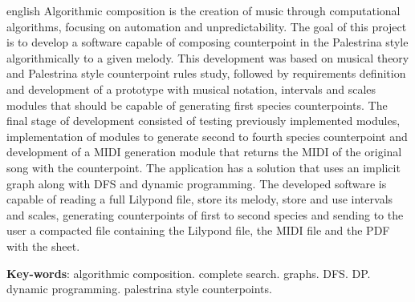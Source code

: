 \begin{resumo}[Abstract]
 \begin{otherlanguage*}{english}
   Algorithmic composition is the creation of music through computational algorithms, focusing on automation and unpredictability. The goal of this project is to develop a software capable of composing counterpoint in the Palestrina style algorithmically to a given melody. This development was based on musical theory and Palestrina style counterpoint rules study, followed by requirements definition and development of a prototype with musical notation, intervals and scales modules that should be capable of generating first species counterpoints. The final stage of development consisted of testing previously implemented modules, implementation of modules to generate second to fourth species counterpoint and development of a MIDI generation module that returns the MIDI of the original song with the counterpoint. The application has a solution that uses an implicit graph along with DFS and dynamic programming. The developed software is capable of reading a full Lilypond file, store its melody, store and use intervals and scales, generating counterpoints of first to second species and sending to the user a compacted file containing the Lilypond file, the MIDI file and the PDF with the sheet.

   \vspace{\onelineskip}

   \noindent
   \textbf{Key-words}: algorithmic composition. complete search. graphs. DFS. DP. dynamic programming. palestrina style counterpoints.
 \end{otherlanguage*}
\end{resumo}
